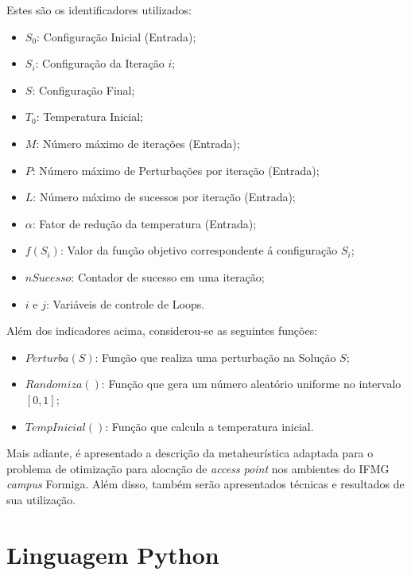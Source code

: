 \documentclass[
	12pt,				%
	twoside,			%
	a4paper,			%
	english,			%
	french,				%
	spanish,			%
	brazil				%
	]{abntex2}
\begin{document}
Estes são os identificadores utilizados:

\begin{itemize}
\item
  \(S_{0}\): Configuração Inicial (Entrada);
\item
  \(S_{i}\): Configuração da Iteração \(i\);
\item
  \(S\): Configuração Final;
\item
  \(T_{0}\): Temperatura Inicial;
\item
  \(M\): Número máximo de iterações (Entrada);
\item
  \(P\): Número máximo de Perturbações por iteração (Entrada);
\item
  \(L\): Número máximo de sucessos por iteração (Entrada);
\item
  \(\alpha\): Fator de redução da temperatura (Entrada);
\item
  \(f(S_{i})\): Valor da função objetivo correspondente á configuração
  \(S_{i}\);
\item
  \(nSucesso\): Contador de sucesso em uma iteração;
\item
  \(i\) e \(j\): Variáveis de controle de Loops.
\end{itemize}

Além dos indicadores acima, considerou-se as seguintes funções:

\begin{itemize}
\item
  \(Perturba(S)\): Função que realiza uma perturbação na Solução \(S\);
\item
  \(Randomiza()\): Função que gera um número aleatório uniforme no
  intervalo \([0, 1]\);
\item
  \(TempInicial()\): Função que calcula a temperatura inicial.
\end{itemize}

Mais adiante, é apresentado a descrição da metaheurística adaptada para
o problema de otimização para alocação de \emph{access point} nos
ambientes do IFMG \emph{campus} Formiga. Além disso, também serão
apresentados técnicas e resultados de sua utilização.

\section{Linguagem Python}\label{linguagem-python}
\end{document}
